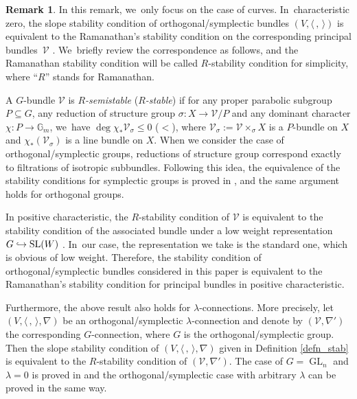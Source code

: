 \documentclass[JEP,XML,SOM,Unicode,published]{cedram}
\newcommand\hto{\mathrel{\lhook\joinrel\to}}
\newcommand{\lconnection}{$\lambda$\nobreakdash-con\-nec\-tion\xspace}
\newcommand{\lconnections}{$\lambda$\nobreakdash-con\-nec\-tions\xspace}
\DeclareMathOperator{\GL}{GL}
\DeclareMathOperator{\SL}{SL}
\theoremstyle{plain}
\theoremstyle{definition}
\newtheorem{rem}[thm]{Remark}
\begin{document}
\begin{rem}
In this remark, we~only focus on the case of curves. In~characteristic zero, the slope stability condition of orthogonal/symplectic bundles $(V, \langle \,, \, \rangle)$ is equivalent to the Ramanathan's stability condition on the corresponding principal bundles~$\mathcal{V}$ \cite{Ra75,Ra96a,Ra96b}. We~briefly review the correspondence as follows, and the Ramanathan stability condition will be called $R$-stability condition for simplicity, where ``$R$'' stands for Ramanathan.

A $G$-bundle $\mathcal{V}$ is \emph{$R$-semistable} (\resp \emph{$R$-stable}) if for any proper parabolic subgroup $P \subseteq G$, any reduction of structure group $\sigma: X \to \mathcal{V}/P$ and any dominant character $\chi: P \to \mathbb{G}_m$, we~have $\deg \chi_* \mathcal{V}_\sigma \leq 0$ (\resp $<$), where $\mathcal{V}_\sigma := \mathcal{V} \times_{\sigma} X$ is a $P$-bundle on $X$ and $\chi_* (\mathcal{V}_\sigma)$ is a line bundle on $X$. When we consider the case of orthogonal/symplectic groups, reductions of structure group correspond exactly to filtrations of isotropic subbundles. Following this idea, the equivalence of the stability conditions for symplectic groups is proved in \cite[App.]{KSZ21}, and the same argument holds for orthogonal groups.

In positive characteristic, the $R$-stability condition of $\mathcal{V}$ is equivalent to the stability condition of the associated bundle under a low weight representation $G \hto \SL(W)$ \cite[\S 2]{BP03}. In~our case, the representation we take is the standard one, which is obvious of low weight. Therefore, the stability condition of orthogonal/symplectic bundles considered in this paper is equivalent to the Ramanathan's stability condition for principal bundles in positive characteristic.

Furthermore, the above result also holds for \lconnections. More precisely, let $(V, \langle \,, \, \rangle, \nabla)$ be an orthogonal/symplectic \lconnection and denote by $(\mathcal{V},\nabla')$ the corresponding $G$-connection, where $G$ is the orthogonal/symplectic group. Then the slope stability condition of $(V, \langle \,, \, \rangle, \nabla)$ given in Definition \ref{defn_stab} is equivalent to the $R$-stability condition of $(\mathcal{V},\nabla')$. The case of $G=\GL_n$ and $\lambda = 0$ is proved in \cite[Prop.\,5.5]{KSZ23} and the orthogonal/symplectic case with arbitrary $\lambda$ can be proved in the same way.
\end{rem}
\end{document}
